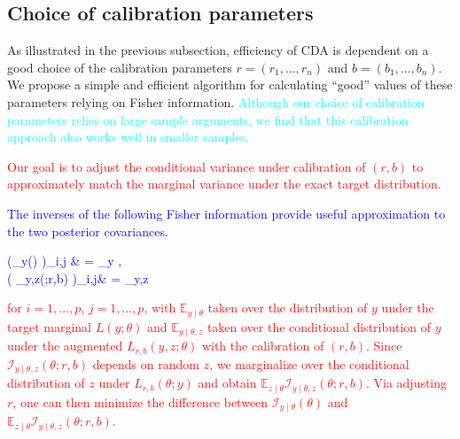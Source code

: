 \documentclass[11pt]{article}
\newcommand{\leojames}[1]{\textcolor{blue}{#1}}
\newcommand{\leo}[1]{{\textcolor{red}{#1}}}
\newcommand{\dave}[1]{{\textcolor{cyan}{#1}}}
\newcommand{\be}{\begin{equs}}
\newcommand{\ee}{\end{equs}}
\newcommand{\bb}[1]{\mathbb{#1}}
\newcommand{\mc}[1]{\mathcal{#1}}
\begin{document}
\subsection{Choice of calibration parameters} \label{sec:tuning}
As illustrated in the previous subsection, efficiency of CDA is dependent on a good choice of the calibration parameters $r=(r_1,\ldots,r_n)$ and $b=(b_1,\ldots,b_n)$.  We propose a simple and efficient algorithm for calculating ``good'' values of these parameters relying on Fisher information.  \dave{Although our choice of calibration parameters relies on large sample arguments, we find that this calibration approach also works well in smaller samples.}

\leo{
Our
goal is to adjust the conditional variance under calibration of $(r,b)$ to approximately match the marginal variance under the exact target distribution.
\leojames{
The inverses of the following Fisher information provide  useful approximation to the two posterior covariances.\be   \left (\mc I_{y\mid \theta}({\theta}) \right)_{i,j} &  = \bb E_{y\mid \theta} \left[ \left( \frac{\partial}{\partial \theta_i} \log L(y;\theta) \right) \left( \frac{\partial}{\partial \theta_j} \log L(y;\theta) \right) \right], \\
 \left(  \mc I_{y\mid \theta,z}({\theta};r,b) \right)_{i,j}& = \bb E_{y\mid \theta,z} \left[ \left( \frac{\partial}{\partial \theta_i} \log L_{r,b}(y,z;\theta) \right)\left( \frac{\partial}{\partial \theta_j} \log L_{r,b}(y,z;\theta) \right) \right]
\ee
}
for $i=1,\ldots,p$, $j=1,\ldots,p$, with $\bb E_{y\mid \theta}$ taken over the distribution of $y$ under the target marginal $L(y;\theta)$ and $\bb E_{y\mid \theta,z}$ taken over the conditional distribution of $y$ under the augmented $L_{r,b}(y,z;\theta)$ with the calibration of $(r,b)$.
Since $\mc I_{y\mid \theta,z}({\theta};r,b)$ depends on random $z$, we marginalize over
the conditional distribution
of $z$ under $L_{r,b}(\theta; y)$ and obtain $\bb E_{z\mid \theta}\mc I_{y\mid \theta,z}(\theta;r,b)$. Via adjusting $r$, one can then  minimize the difference between $\mc  I_{y\mid \theta}(\theta)$
and $\bb E_{z\mid \theta}\mc I_{y\mid \theta,z}(\theta;r,b)$.}
\end{document}
